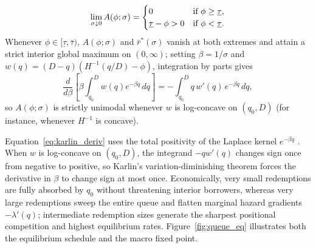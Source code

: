 \begin{theorem}
\begin{enumerate}[label=(\roman*), leftmargin=2.2em, itemsep=2pt]
\begin{equation}\label{eq:sigma_limit}
\lim_{\sigma \downarrow 0} A(\phi; \sigma) = \begin{cases}
0 & \textup{if } \phi \ge \underline{\tau}, \\
\underline{\tau} - \phi > 0 & \textup{if } \phi < \underline{\tau}.
\end{cases}
\end{equation}
Whenever $\phi \in [\underline{\tau}, \bar{\tau})$, $A(\phi; \sigma)$ and $\bar{r}^*(\sigma)$ vanish at both extremes and attain a strict interior global maximum on $(0, \infty)$; setting $\beta = 1/\sigma$ and $w(q) = (D - q)(H^{-1}(q/D) - \phi)$, integration by parts gives
\begin{equation}\label{eq:karlin_deriv}
\frac{d}{d\beta}\!\left[\beta\int_{q_0}^D w(q)e^{-\beta q}\,dq\right] = -\int_{q_0}^D q\,w'(q)\,e^{-\beta q}\,dq,
\end{equation}
so $A(\phi; \sigma)$ is strictly unimodal whenever $w$ is log-concave on $(q_0, D)$ (for instance, whenever $H^{-1}$ is concave).
\end{enumerate}
\end{theorem}

Equation~\eqref{eq:karlin_deriv} uses the total positivity of the Laplace kernel $e^{-\beta q}$ \citep{karlin1968total}. When $w$ is log-concave on $(q_0, D)$, the integrand $-q w'(q)$ changes sign once from negative to positive, so Karlin's variation-diminishing theorem forces the derivative in $\beta$ to change sign at most once. Economically, very small redemptions are fully absorbed by $q_0$ without threatening interior borrowers, whereas very large redemptions sweep the entire queue and flatten marginal hazard gradients $-\lambda'(q)$; intermediate redemption sizes generate the sharpest positional competition and highest equilibrium rates. Figure~\ref{fig:queue_eq} illustrates both the equilibrium schedule and the macro fixed point.

